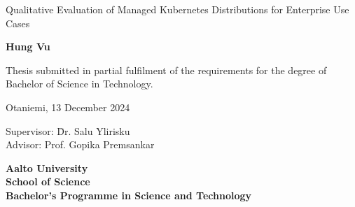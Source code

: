 \thispagestyle{empty}

{\parindent0pt %
\begin{spacing}{1.1}

 {\sffamily{}}
\end{spacing}

\vspace{12.7mm}

\begin{spacing}{1.63}
{\fontsize{17.8pt}{17.8pt}\selectfont Qualitative Evaluation of Managed Kubernetes Distributions for Enterprise Use Cases}
\end{spacing}

\vspace{10.5mm}

\begin{spacing}{1.2}
{\fontsize{13pt}{13pt}\selectfont }
\end{spacing}

\vspace{10.6mm}

{\fontsize{13.9pt}{13.9pt}\bfseries\sffamily\lsstyle Hung Vu}

\vfill

{\fontsize{10.3pt}{10.3pt}\sffamily\lsstyle\raggedright
\begin{spacing}{1.06}

Thesis submitted in partial fulfilment of the requirements for the
degree of Bachelor of Science in Technology.

Otaniemi, 13 December 2024

\begin{tabbing}
Supervisor:\hspace{6mm} \= Dr. Salu Ylirisku\\
Advisor: \> Prof. Gopika Premsankar
\end{tabbing}
\vspace{-4mm}
\end{spacing}
} %

\vspace{11.5mm}

\begin{spacing}{.9}
{\bfseries\sffamily\lsstyle Aalto University \\
School of Science \\
Bachelor’s Programme in Science and Technology}
\end{spacing}
} %



